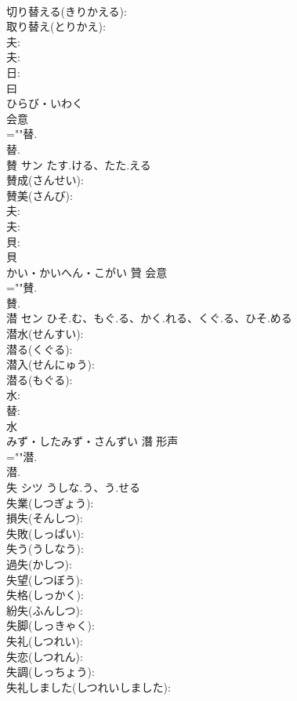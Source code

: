 \documentclass[8pt]{extreport}
\begin{document}
\begin{CJK}{UTF8}{min}
\\	切り替える(きりかえる): 
\\	取り替え(とりかえ): 
\\	夫: 
\\	夫: 
\\	日: 
\\	曰	
\\	ひらび・いわく	
\\	会意 
\\	=""替.
\\	替.
\\	賛	サン	たす.ける、たた.える		
\\	賛成(さんせい): 
\\	賛美(さんび): 
\\	夫: 
\\	夫: 
\\	貝: 
\\	貝	
\\	かい・かいへん・こがい	贊	会意 
\\	=""賛.
\\	賛.
\\	潜	セン	ひそ.む、もぐ.る、かく.れる、くぐ.る、ひそ.める		
\\	潜水(せんすい): 
\\	潜る(くぐる): 
\\	潜入(せんにゅう): 
\\	潜る(もぐる): 
\\	水: 
\\	替: 
\\	水	
\\	みず・したみず・さんずい	潛	形声 
\\	=""潜.
\\	潜.
\\	失	シツ	うしな.う、う.せる		
\\	失業(しつぎょう): 
\\	損失(そんしつ): 
\\	失敗(しっぱい): 
\\	失う(うしなう): 
\\	過失(かしつ): 
\\	失望(しつぼう): 
\\	失格(しっかく): 
\\	紛失(ふんしつ): 
\\	失脚(しっきゃく): 
\\	失礼(しつれい): 
\\	失恋(しつれん): 
\\	失調(しっちょう): 
\\	失礼しました(しつれいしました): 

\end{CJK}
\end{document}
